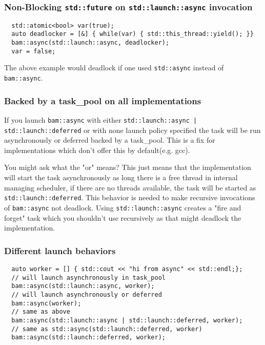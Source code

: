 \documentclass[11pt, a4paper]{article}
\begin{document}
\subsubsection{ Non-Blocking \texttt{std::future} on \texttt{std::launch::async} invocation }

\begin{lstlisting}
  std::atomic<bool> var(true);
  auto deadlocker = [&] { while(var) { std::this_thread::yield(); }}
  bam::async(std::launch::async, deadlocker);
  var = false;
\end{lstlisting}

The above example would deadlock if one used \texttt{std::async} instead of \texttt{bam::async}. 

\subsubsection{ Backed by a task\_pool on all implementations}

If you launch \texttt{bam::async} with either \texttt{std::launch::async | std::launch::deferred} or with none launch policy specified the task will be run asynchronously or deferred backed by a task\_pool. This is a fix for implementations which don't offer this by default(e.g. gcc). 

You might ask what the "or" means? This just means that the implementation will start the task asynchronously as long there is a free thread in internal managing scheduler, if there are no threads available, the task will be started as \texttt{std::launch::deferred}. This behavior is needed to make recursive invocations of \texttt{bam::async} not deadlock. Using \texttt{std::launch::async} creates a "fire and forget" task which you shouldn't use recursively as that might deadlock the implementation.

\subsubsection{ Different launch behaviors} 

\begin{lstlisting}
  auto worker = [] { std::cout << "hi from async" << std::endl;};
  // will launch asynchronously in task_pool
  bam::async(std::launch::async, worker); 
  // will launch asynchronously or deferred
  bam::async(worker);
  // same as above
  bam::async(std::launch::async | std::launch::deferred, worker);
  // same as std::async(std::launch::deferred, worker)
  bam::async(std::launch::deferred, worker); 


\end{lstlisting}
\end{document}
